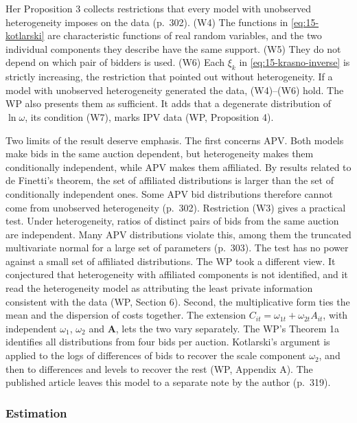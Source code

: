 Her Proposition 3 collects restrictions that every model with unobserved heterogeneity imposes on the
data (p.~302). (W4) The functions in \eqref{eq:15-kotlarski} are characteristic functions of real
random variables, and the two individual components they describe have the same support. (W5) They do
not depend on which pair of bidders is used. (W6) Each $\xi_k$ in \eqref{eq:15-krasno-inverse} is
strictly increasing, the restriction that \citet{GuerrePerrigneVuong2000} pointed out without
heterogeneity. If a model with unobserved heterogeneity generated the data, (W4)--(W6) hold. The WP
also presents them as sufficient. It adds that a degenerate distribution of $\ln\omega$, its condition
(W7), marks IPV data (WP, Proposition 4).

Two limits of the result deserve emphasis. The first concerns APV. Both models make bids in the same
auction dependent, but heterogeneity makes them conditionally independent, while APV makes them
affiliated. By results related to de Finetti's theorem, the set of affiliated distributions is larger
than the set of conditionally independent ones. Some APV bid distributions therefore cannot come from
unobserved heterogeneity (p.~302). Restriction (W3) gives a practical test. Under heterogeneity,
ratios of distinct pairs of bids from the same auction are independent. Many APV distributions violate
this, among them the truncated multivariate normal for a large set of parameters (p.~303). The
test has no power against a small set of affiliated distributions. The WP took a different view. It
conjectured that heterogeneity with affiliated components is not identified, and it read the
heterogeneity model as attributing the least private information consistent with the data (WP,
Section 6). Second, the multiplicative form ties the mean and the dispersion of costs together. The
extension $C_{it}=\omega_{1t}+\omega_{2t}A_{it}$, with independent $\omega_1$, $\omega_2$ and $\bm A$,
lets the two vary separately. The WP's Theorem 1a identifies all distributions from four bids per
auction. Kotlarski's argument is applied to the logs of differences of bids to recover the scale
component $\omega_2$, and then to differences and levels to recover the rest (WP, Appendix A). The
published article leaves this model to a separate note by the author (p.~319).

\subsubsection{Estimation}

